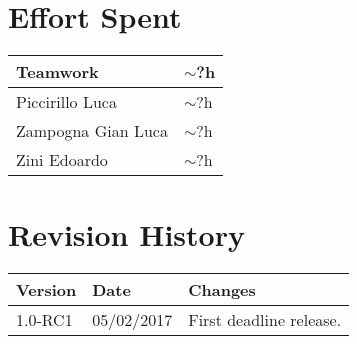 \section{Effort Spent}
\begin{tabular}{| p{5cm} | p{5cm} |}
\hline
Teamwork & $\sim$?h\\
\hline
Piccirillo Luca & $\sim$?h\\
\hline
Zampogna Gian Luca & $\sim$?h\\
\hline
Zini Edoardo & $\sim$?h\\
\hline
\end{tabular}


\section{Revision History}
\begin{tabular}{| l | l | p{10cm} |}
\hline
\textbf{Version} & \textbf{Date} & \textbf{Changes}\\
\hline
1.0-RC1 & 05/02/2017 & First deadline release.\\
\hline
\end{tabular}